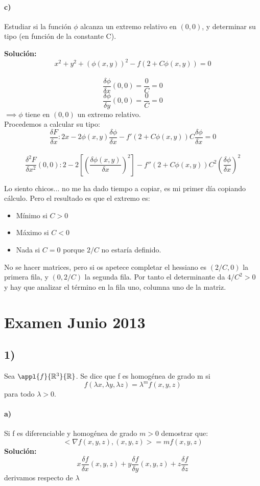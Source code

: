 \paragraph{c)} Estudiar si la función $\phi$ alcanza un extremo relativo en $(0,0)$, y determinar su tipo (en función de la constante C).

\textbf{Solución:}\\
$$x^2 + y^2 + (\phi (x,y))^2 -f(2+C\phi (x,y)) = 0$$\\
$$\frac{\delta \phi}{\delta x}(0,0) = \frac{0}{C} = 0$$
$$\frac{\delta \phi}{\delta y}(0,0) = \frac{0}{C} = 0$$
$\implies \phi$ tiene en $(0,0)$ un extremo relativo.\\

Procedemos a calcular su tipo:\\
$$\frac{\delta F}{\delta x}: 2x-2\phi (x,y)\frac{\delta \phi}{\delta x}-f'(2+C\phi (x, y))C\frac{\delta \phi}{\delta x} = 0$$\\
$$\frac{\delta ^2 F}{\delta x^2}(0,0): 2-2[(\frac{\delta \phi (x,y)}{\delta x})^2] - f''(2+C\phi (x,y))C^2(\frac{\delta \phi}{\delta x})^2$$

Lo siento chicos... no me ha dado tiempo a copiar, es mi primer día copiando cálculo. Pero el resultado es que el extremo es:

\begin{itemize}
\item Mínimo si $C>0$
\item Máximo si $C<0$
\item Nada si $C=0$ porque $2/C$ no estaría definido. 
\end{itemize}

No se hacer matrices, pero si os apetece completar el hessiano es $(2/C, 0)$ la primera fila, y $(0, 2/C)$ la segunda fila. Por tanto el determinante da $4/C^2 > 0$ y hay que analizar el término en la fila uno, columna uno de la matriz.

\section{Examen Junio 2013}
\subsection{1)} Sea $\appl{f}{\mathbb{R}^3}{\mathbb{R}}$. Se dice que f es homogénea de grado m si\\
$$f(\lambda x, \lambda y, \lambda z) = \lambda ^m f(x,y,z)$$ para todo $\lambda > 0$.

\paragraph{a)} Si f es diferenciable y homogénea de grado $m>0$ demostrar que:
$$<\nabla f(x,y,z), (x,y,z) > = mf(x,y,z)$$
\textbf{Solución:}\\
$$x\frac{\delta f}{\delta x}(x,y,z) + y\frac{\delta f}{\delta y}(x,y,z) + z\frac{\delta f}{\delta z}$$
derivamos respecto de $\lambda$


